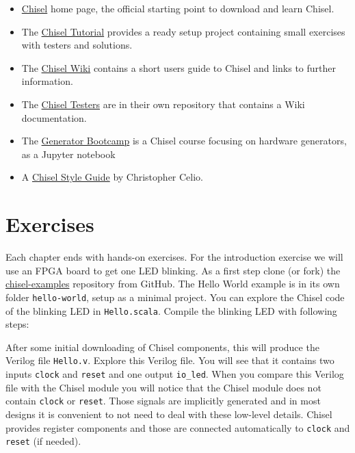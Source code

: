 \documentclass[%
    10pt, %
    headinclude, footexclude,
    openright, %
    notitlepage,
    cleardoubleempty,
    headsepline,
    pointlessnumbers,
    bibtotoc, idxtotoc,
    ]{scrbook}
\newcommand{\code}[1]{{\small{\texttt{#1}}}}
\newcommand{\myref}[2]{\href{#1}{#2}}
\begin{document}
\begin{itemize}
\item \myref{https://chisel.eecs.berkeley.edu/}{Chisel} home page, the official starting point to
download and learn Chisel.
\item The \myref{https://github.com/ucb-bar/chisel-tutorial}{Chisel Tutorial} provides a ready setup
project containing small exercises with testers and solutions.

\item The \myref{https://github.com/freechipsproject/chisel3/wiki}{Chisel Wiki} contains
a short users guide to Chisel and links to further information.
\item The \myref{https://github.com/freechipsproject/chisel-testers}{Chisel Testers} are in
their own repository that contains a Wiki documentation.
\item The \myref{https://github.com/ucb-bar/generator-bootcamp}{Generator Bootcamp} is
a Chisel course focusing on hardware generators, as a Jupyter notebook
\item A \myref{https://github.com/ccelio/chisel-style-guide}{Chisel Style Guide} by Christopher Celio.
\end{itemize}

\section{Exercises}

Each chapter ends with hands-on exercises. For the introduction exercise we will use an
FPGA board to get one LED blinking.
As a first step clone (or fork) the \myref{https://github.com/schoeberl/chisel-examples}{chisel-examples}
repository from GitHub.
The Hello World example is in its own folder \code{hello-world}, setup as
a minimal project. You can explore the Chisel code of the blinking LED
in \code{Hello.scala}.
Compile the blinking LED with following steps:


After some initial downloading of Chisel components, this will produce the Verilog file \code{Hello.v}.
Explore this Verilog file. You will see that it contains two inputs \code{clock} and \code{reset}
and one output \code{io\_led}. When you compare this Verilog file with the Chisel module
you will notice that the Chisel module does not contain \code{clock} or \code{reset}.
Those signals are implicitly generated and in most designs it is convenient to not need to
deal with these low-level details. Chisel provides register components and those
are connected automatically to \code{clock} and \code{reset} (if needed).
\end{document}
